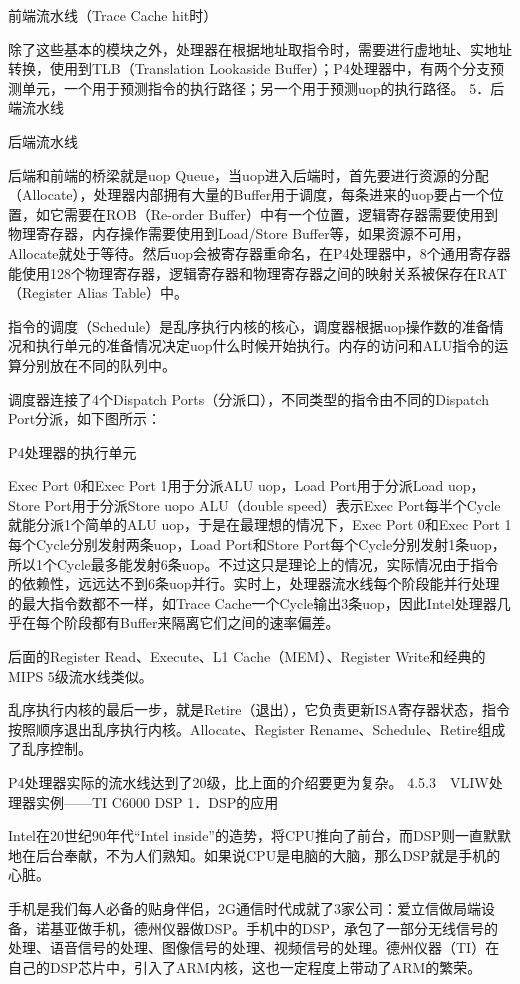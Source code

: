 \documentclass[12pt,UTF8]{ctexbook}
\begin{document}
前端流水线（Trace Cache hit时）

除了这些基本的模块之外，处理器在根据地址取指令时，需要进行虚地址、实地址转换，使用到TLB（Translation Lookaside Buffer）；P4处理器中，有两个分支预测单元，一个用于预测指令的执行路径；另一个用于预测uop的执行路径。
5．后端流水线

后端流水线

后端和前端的桥梁就是uop Queue，当uop进入后端时，首先要进行资源的分配（Allocate），处理器内部拥有大量的Buffer用于调度，每条进来的uop要占一个位置，如它需要在ROB（Re-order Buffer）中有一个位置，逻辑寄存器需要使用到物理寄存器，内存操作需要使用到Load/Store Buffer等，如果资源不可用，Allocate就处于等待。然后uop会被寄存器重命名，在P4处理器中，8个通用寄存器能使用128个物理寄存器，逻辑寄存器和物理寄存器之间的映射关系被保存在RAT（Register Alias Table）中。

指令的调度（Schedule）是乱序执行内核的核心，调度器根据uop操作数的准备情况和执行单元的准备情况决定uop什么时候开始执行。内存的访问和ALU指令的运算分别放在不同的队列中。

调度器连接了4个Dispatch Ports（分派口），不同类型的指令由不同的Dispatch Port分派，如下图所示：

P4处理器的执行单元

Exec Port 0和Exec Port 1用于分派ALU uop，Load Port用于分派Load uop，Store Port用于分派Store uopo ALU（double speed）表示Exec Port每半个Cycle就能分派1个简单的ALU uop，于是在最理想的情况下，Exec Port 0和Exec Port 1每个Cycle分别发射两条uop，Load Port和Store Port每个Cycle分别发射1条uop，所以1个Cycle最多能发射6条uop。不过这只是理论上的情况，实际情况由于指令的依赖性，远远达不到6条uop并行。实时上，处理器流水线每个阶段能并行处理的最大指令数都不一样，如Trace Cache一个Cycle输出3条uop，因此Intel处理器几乎在每个阶段都有Buffer来隔离它们之间的速率偏差。

后面的Register Read、Execute、L1 Cache（MEM）、Register Write和经典的MIPS 5级流水线类似。

乱序执行内核的最后一步，就是Retire（退出），它负责更新ISA寄存器状态，指令按照顺序退出乱序执行内核。Allocate、Register Rename、Schedule、Retire组成了乱序控制。

P4处理器实际的流水线达到了20级，比上面的介绍要更为复杂。
4.5.3　VLIW处理器实例——TI C6000 DSP
1．DSP的应用

Intel在20世纪90年代“Intel inside”的造势，将CPU推向了前台，而DSP则一直默默地在后台奉献，不为人们熟知。如果说CPU是电脑的大脑，那么DSP就是手机的心脏。

手机是我们每人必备的贴身伴侣，2G通信时代成就了3家公司：爱立信做局端设备，诺基亚做手机，德州仪器做DSP。手机中的DSP，承包了一部分无线信号的处理、语音信号的处理、图像信号的处理、视频信号的处理。德州仪器（TI）在自己的DSP芯片中，引入了ARM内核，这也一定程度上带动了ARM的繁荣。
\end{document}
